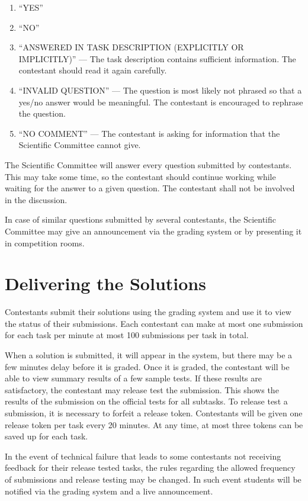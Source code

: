 \documentclass[a5paper,10pt,twoside]{book}
\begin{document}
\begin{enumerate}
    \item “YES”
    \item “NO”
    \item “ANSWERED IN TASK DESCRIPTION (EXPLICITLY OR IMPLICITLY)” — The task
    description contains sufficient information. The contestant should read it
    again carefully.
    \item “INVALID QUESTION” — The question is most likely not phrased so that a
    yes/no answer would be meaningful. The contestant is encouraged to rephrase
    the question.
    \item “NO COMMENT” — The contestant is asking for information that the
    Scientific Committee cannot give.
\end{enumerate}

The Scientific Committee will answer every question submitted by contestants.
This may take some time, so the contestant should continue working while waiting
for the answer to a given question. The contestant shall not be involved in the
discussion.

In case of similar questions submitted by several contestants, the Scientific
Committee may give an announcement via the grading system or by presenting it in
competition rooms.

\section{Delivering the Solutions}

Contestants submit their solutions using the grading system and use it to view
the status of their submissions. Each contestant can make at most one submission
for each task per minute at most 100 submissions per task in total.

When a solution is submitted, it will appear in the system, but there may be a
few minutes delay before it is graded. Once it is graded, the contestant will be
able to view summary results of a few sample tests. If these results are
satisfactory, the contestant may release test the submission. This shows the
results of the submission on the official tests for all subtasks. To release
test a submission, it is necessary to forfeit a release token. Contestants will
be given one release token per task every 20 minutes. At any time, at most three
tokens can be saved up for each task.

In the event of technical failure that leads to some contestants not receiving
feedback for their release tested tasks, the rules regarding the allowed
frequency of submissions and release testing may be changed. In such event
students will be notified via the grading system and a live announcement.
\end{document}
